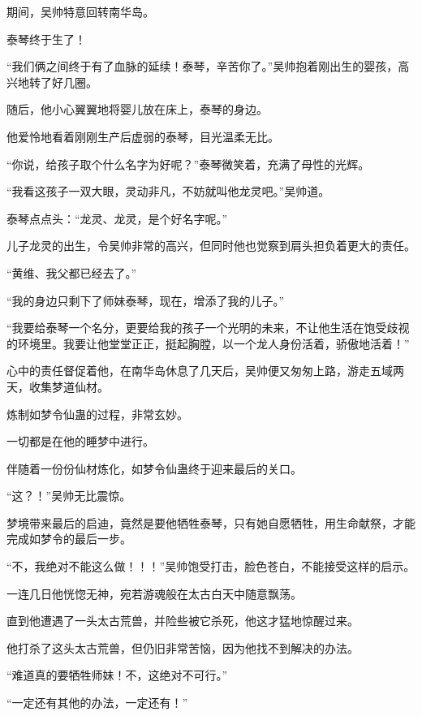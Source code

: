 
\begin{this_body}



期间，吴帅特意回转南华岛。

泰琴终于生了！

“我们俩之间终于有了血脉的延续！泰琴，辛苦你了。”吴帅抱着刚出生的婴孩，高兴地转了好几圈。

随后，他小心翼翼地将婴儿放在床上，泰琴的身边。

他爱怜地看着刚刚生产后虚弱的泰琴，目光温柔无比。

“你说，给孩子取个什么名字为好呢？”泰琴微笑着，充满了母性的光辉。

“我看这孩子一双大眼，灵动非凡，不妨就叫他龙灵吧。”吴帅道。

泰琴点点头：“龙灵、龙灵，是个好名字呢。”

儿子龙灵的出生，令吴帅非常的高兴，但同时他也觉察到肩头担负着更大的责任。

“黄维、我父都已经去了。”

“我的身边只剩下了师妹泰琴，现在，增添了我的儿子。”

“我要给泰琴一个名分，更要给我的孩子一个光明的未来，不让他生活在饱受歧视的环境里。我要让他堂堂正正，挺起胸膛，以一个龙人身份活着，骄傲地活着！”

心中的责任督促着他，在南华岛休息了几天后，吴帅便又匆匆上路，游走五域两天，收集梦道仙材。

炼制如梦令仙蛊的过程，非常玄妙。

一切都是在他的睡梦中进行。

伴随着一份份仙材炼化，如梦令仙蛊终于迎来最后的关口。

“这？！”吴帅无比震惊。

梦境带来最后的启迪，竟然是要他牺牲泰琴，只有她自愿牺牲，用生命献祭，才能完成如梦令的最后一步。

“不，我绝对不能这么做！！！”吴帅饱受打击，脸色苍白，不能接受这样的启示。

一连几日他恍惚无神，宛若游魂般在太古白天中随意飘荡。

直到他遭遇了一头太古荒兽，并险些被它杀死，他这才猛地惊醒过来。

他打杀了这头太古荒兽，但仍旧非常苦恼，因为他找不到解决的办法。

“难道真的要牺牲师妹！不，这绝对不可行。”

“一定还有其他的办法，一定还有！”


\end{this_body}
